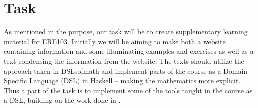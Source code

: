 \section{Task}
As mentioned in the purpose, our task will be to create supplementary learning material for ERE103. Initially we will be aiming to make both a website containing information and some illuminating examples and exercises as well as a text condensing the information from the website. The texts should utilize the approach taken in DSLsofmath and implement parts of the course as a Domain-Specific Language (DSL) in Haskell -- making the mathematics more explicit. 
Thus a part of the task is to implement some of the tools taught in the course as a DSL, building on the work done in \cite{tssarbete}. 
\iffalse
Problem/Uppgift: (slides)

Analysen identifierar frågorna eller uppgiften som ska tas upp i projektet. 

Viktigt att göra en problemanalys eller uppgiftsanalys även om handledaren och/eller företaget redan har specificerat ett/en problem/uppgift. 

Det ”verkliga” primära problemet/uppgiften skiljer sig ofta från det som föreslagits i början av uppdragsgivaren. 

Problemanalysen syftar också till att bryta ner problemet/uppgiften i mindre och mer detaljerade delproblem/deluppgifter, vilket också leder till formulering av delsyften. 

En bra analys som identifierar delsyften vilar på användning av teorier och modeller från litteraturen.
\fi